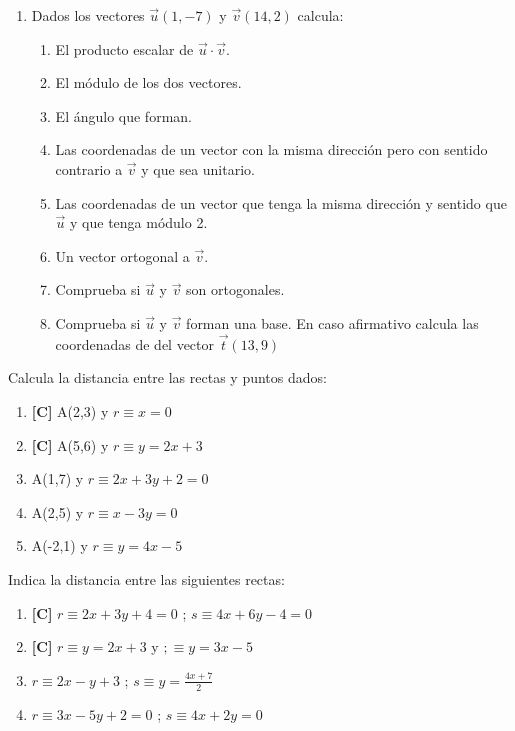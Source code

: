 \begin{enumerate}[topsep=0pt]
	\item Dados los vectores $ \overrightarrow{u}(1,-7)$ y $ \overrightarrow{v} (14,2) $ calcula:
	\begin{enumerate}[topsep=0pt, label=\arabic*)]
		\item El producto escalar de $\overrightarrow{u} \cdot \overrightarrow{v}$.
		\item El módulo de los dos vectores.
		\item El ángulo que forman.
		\item Las coordenadas de un vector con la misma dirección  pero con sentido contrario a $\overrightarrow{v}$ y que sea unitario.
		\item Las coordenadas de un vector que tenga la misma dirección y sentido que $\overrightarrow{u}$ y que tenga módulo 2.
		\item Un vector ortogonal a $\overrightarrow{v}$.
		\item Comprueba si $\vec{u}$ y $\vec{v}$ son ortogonales.
		\item Comprueba si $\vec{u}$ y $\vec{v}$ forman una base. En caso afirmativo calcula las coordenadas de del vector $\overrightarrow{t}(13,9)$
	\end{enumerate}


\end{enumerate}

\Exercicio Calcula la distancia entre las rectas y puntos dados:
\begin{enumerate}[topsep=0pt]
	\item \textbf{[C]} A(2,3) y $ r \equiv x = 0 $
	\item \textbf{[C]} A(5,6) y $ r \equiv y = 2x + 3 $
	
	\item A(1,7) y $ r \equiv 2x + 3y +2 = 0 $
	\item A(2,5) y $ r \equiv x - 3y = 0 $
	\item A(-2,1) y $ r \equiv y = 4x - 5 $
\end{enumerate}


\Exercicio Indica la distancia entre las siguientes rectas:

\begin{enumerate}[topsep=0pt]
	\item \textbf{[C]} $ r \equiv 2x + 3y +4 = 0 $ ; $ s \equiv 4x + 6y - 4 = 0 $
	\item \textbf{[C]} $ r \equiv y = 2x + 3 $ y $ ; \equiv y = 3x - 5 $
	
	\item $ r \equiv 2x - y +3 $ ; $ s \equiv y = \frac{4x + 7}{2}  $
	\item $ r \equiv 3x - 5y +2 = 0 $ ; $ s \equiv 4x + 2y = 0  $
\end{enumerate}


